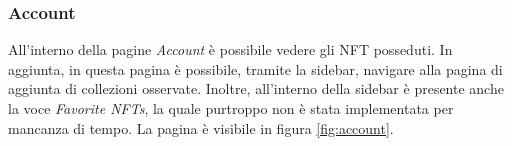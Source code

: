 \subsubsection{Account}

All'interno della pagine \textit{Account} è possibile vedere gli NFT posseduti. In aggiunta, in questa pagina è possibile, tramite la sidebar, navigare alla pagina di aggiunta di collezioni osservate. Inoltre, all'interno della sidebar è presente anche la voce \textit{Favorite NFTs}, la quale purtroppo non è stata implementata per mancanza di tempo. La pagina è visibile in figura \ref{fig:account}.

\begin{figure}[H]
    \begin{minipage}{0.7\textwidth}
      \centering
    \end{minipage}
    \hfill
    \begin{minipage}{0.26\textwidth }
      \centering

\end{minipage}
\end{figure}
